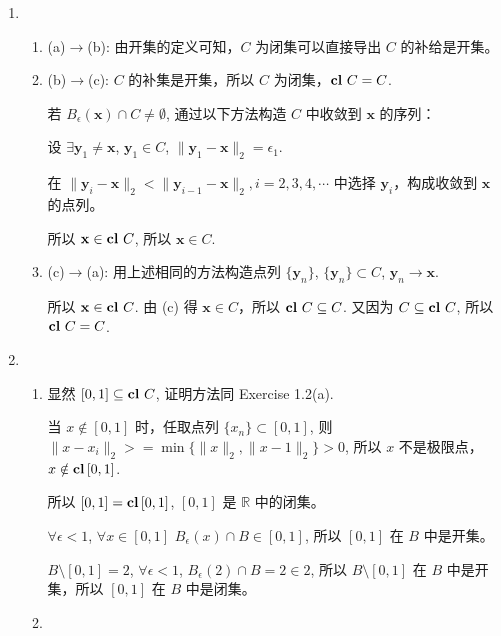 \documentclass[11pt,letter,notitlepage]{article}
\theoremstyle{definition}
\DeclareMathOperator*{\cl}{\bf cl\,}
\begin{document}
\begin{solution}
	\begin{enumerate}
		\item \begin{enumerate}
			      \item (a)$\to$(b): 由开集的定义可知，$C$ 为闭集可以直接导出 $C$ 的补给是开集。
			      \item (b)$\to$(c): $C$ 的补集是开集，所以 $C$ 为闭集，$\cl C=C$.

			            若 $B_\epsilon(\mathbf{x})\cap C\neq \emptyset$, 通过以下方法构造 $C$ 中收敛到 $\mathbf{x}$ 的序列：

			            设 $\exists \mathbf{y}_1 \neq \mathbf{x}$, $\mathbf{y}_1\in C$, $\|\mathbf{y}_1-\mathbf{x}\|_2=\epsilon_1$.

			            在 $\|\mathbf{y}_i-\mathbf{x}\|_2<\|\mathbf{y}_{i-1}-\mathbf{x}\|_2, i=2,3,4,\cdots$ 中选择 $\mathbf{y}_i$，构成收敛到 $\mathbf{x}$ 的点列。

			            所以 $\mathbf{x} \in \cl C$, 所以 $\mathbf{x}\in C$.
			      \item (c)$\to$(a): 用上述相同的方法构造点列 $\{\mathbf{y}_n\}$, $\{\mathbf{y}_n\}\subset C$, $\mathbf{y}_n\to \mathbf{x}$.

			            所以 $\mathbf{x}\in \cl C$. 由 (c) 得 $\mathbf{x}\in C$，所以 $\cl C\subseteq C$. 又因为 $C\subseteq \cl C$, 所以 $\cl C=C$.
		      \end{enumerate}
		\item \begin{enumerate}
			      \item 显然 $[0,1]\subseteq \cl C$, 证明方法同 Exercise 1.2(a).

			            当 $x\notin [0,1]$ 时，任取点列 $\{x_n\}\subset[0,1]$, 则 $\|x-x_i\|_2>=\min \{\|x\|_2,\|x-1\|_2\}>0$, 所以 $x$ 不是极限点，$x\notin \cl [0,1]$.

			            所以 $[0,1]=\cl [0,1]$, $[0,1]$ 是 $\mathbb{R}$ 中的闭集。

			            $\forall \epsilon <1$, $\forall x \in [0,1]$ $B_\epsilon(x)\cap B\in [0,1]$, 所以 $[0,1]$ 在 $B$ 中是开集。

			            $B\setminus [0,1]={2}$, $\forall \epsilon <1$, $B_\epsilon (2)\cap B={2}\in{2}$, 所以 $B\setminus [0,1]$ 在 $B$ 中是开集，所以 $[0,1]$ 在 $B$ 中是闭集。
			      \item \begin{enumerate}

			            \end{enumerate}
		      \end{enumerate}
	\end{enumerate}
\end{solution}
\newpage
\end{document}
